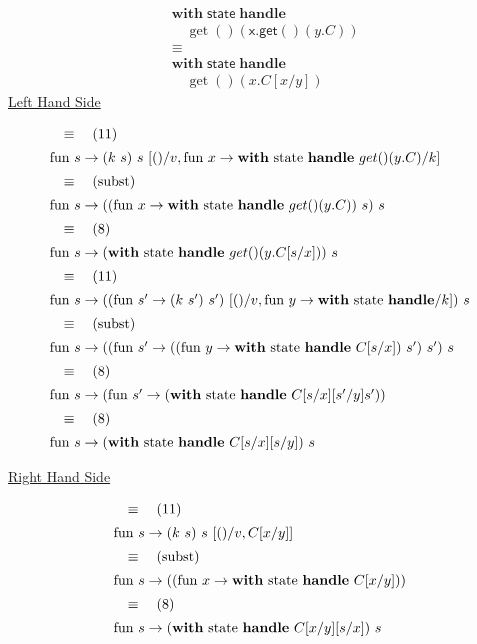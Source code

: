 \documentclass[logo,bsc,singlespacing,parskip]{infthesis}
\begin{document}
\[
\begin{aligned}
    &\mathsf{\textbf{with}} \; \mathsf{state} \; \mathsf{\textbf{handle}} \\
    &\quad \operatorname{get}() \left( \mathsf{x.get}() \left( y.C \right) \right) \\
    &\equiv \\
    &\mathsf{\textbf{with}} \; \mathsf{state} \; \mathsf{\textbf{handle}} \\
    &\quad \operatorname{get}() \left( x.C[x/y] \right)
\end{aligned}
\]
\underline{Left Hand Side}

\[ 
\begin{array}{l}
\quad\equiv\quad (11) \\[5pt]
\text{fun } s \rightarrow (k\ s)\ s\ [()/v, \text{fun } x \rightarrow \text{\textbf{with} state \textbf{handle} } get()(y.C)/k] \\[5pt]
\quad\equiv\quad (\text{subst}) \\[5pt]
\text{fun } s \rightarrow ((\text{fun } x \rightarrow \text{\textbf{with} state \textbf{handle} } get()(y.C))\ s)\ s \\[5pt]
\quad\equiv\quad (8) \\[5pt]
\text{fun } s \rightarrow (\text{\textbf{with} state \textbf{handle} } get()(y.C[s/x]))\ s \\[5pt]
\quad\equiv\quad (11) \\[5pt]
\text{fun } s \rightarrow ((\text{fun } s'\rightarrow (k\ s')\ s')\ [()/v, \text{fun } y\rightarrow \text{\textbf{with} state \textbf{handle}}/k])\ s \\[5pt]
\quad\equiv\quad (\text{subst}) \\[5pt]
\text{fun } s \rightarrow ((\text{fun } s' \rightarrow (( \text{fun } y \rightarrow \text{\textbf{with} state \textbf{handle} } C[s/x])\ s')\ s')\ s \\[5pt]
\quad\equiv\quad (8) \\[5pt]
\text{fun } s \rightarrow (\text{fun } s' \rightarrow (\text{\textbf{with} state \textbf{handle} } C[s/x][s'/y]s')) \\[5pt]
\quad\equiv\quad (8) \\[5pt]
\text{fun } s \rightarrow (\text{\textbf{with} state \textbf{handle} } C[s/x][s/y])\ s
\end{array}
\]



\underline{Right Hand Side}

\[ 
\begin{array}{l}
\quad\equiv\quad (11) \\[5pt]
\text{fun } s \rightarrow (k\ s)\ s\ [()/v, C[x/y]] \\[5pt]
\quad\equiv\quad (\text{subst}) \\[5pt]
\text{fun } s \rightarrow ((\text{fun } x \rightarrow \text{\textbf{with} state \textbf{handle} } C[x/y])) \\[5pt]
\quad\equiv\quad (8) \\[5pt]
\text{fun } s \rightarrow (\text{\textbf{with} state \textbf{handle} } C[x/y][s/x])\ s
\end{array}
\]
\end{document}
